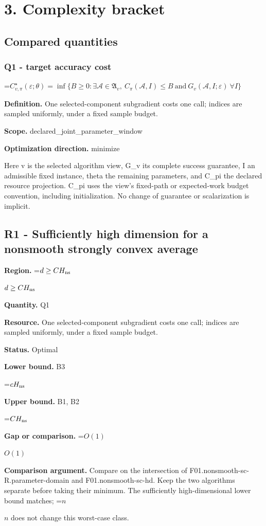 \documentclass[10pt,a4paper]{article}
\newcommand{\AtlasMath}[1]{\par\begingroup\centering\setbox0=\hbox{$\displaystyle #1$}\ifdim\wd0>1.4\linewidth\typeout{ATLAS WIDE FORMULA: \the\wd0}\fi\ifdim\wd0>\linewidth\resizebox{\linewidth}{!}{\box0}\else\box0\fi\par\endgroup}
\newcommand{\AtlasInlineMath}[1]{\begingroup\setbox0=\hbox{$#1$}\ifdim\wd0>.4\linewidth\endgroup\AtlasMath{#1}\else\endgroup$#1$\fi}
\begin{document}
\section{3. Complexity bracket}
\subsection{Compared quantities}
\subsubsection{Q1 - target accuracy cost}
\AtlasMath{C^\star_{v,\pi}(\varepsilon;\theta)=\inf\{B\ge0:\exists\mathcal A\in\mathfrak A_v,\ C_\pi(\mathcal A,I)\le B\ \text{and}\ G_v(\mathcal A,I;\varepsilon)\ \forall I\}}
\textbf{Definition.} One selected-component subgradient costs one call; indices are sampled uniformly, under a fixed sample budget.

\textbf{Scope.} declared\_joint\_parameter\_window

\textbf{Optimization direction.} minimize

Here v is the selected algorithm view, G\_v its complete success guarantee, I an admissible fixed instance, theta the remaining parameters, and C\_pi the declared resource projection. C\_pi uses the view's fixed-path or expected-work budget convention, including initialization. No change of guarantee or scalarization is implicit.

\subsection{R1 - Sufficiently high dimension for a nonsmooth strongly convex average}
\textbf{Region.} \AtlasInlineMath{d\ge CH_{\rm ns}}

\textbf{Quantity.} Q1

\textbf{Resource.} One selected-component subgradient costs one call; indices are sampled uniformly, under a fixed sample budget.

\textbf{Status.} Optimal

\textbf{Lower bound.} B3

\AtlasMath{cH_{\rm ns}}
\textbf{Upper bound.} B1, B2

\AtlasMath{CH_{\rm ns}}
\textbf{Gap or comparison.} \AtlasInlineMath{O(1)}

\textbf{Comparison argument.} Compare on the intersection of F01.nonsmooth-sc-R.parameter-domain and F01.nonsmooth-sc-hd. Keep the two algorithms separate before taking their minimum. The sufficiently high-dimensional lower bound matches; \AtlasInlineMath{n} does not change this worst-case class.
\end{document}
